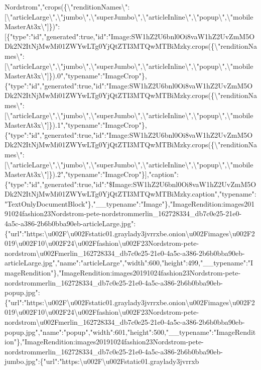 Nordstrom","crops(\{\textbackslash{}"renditionNames\textbackslash{}":{[}\textbackslash{}"articleLarge\textbackslash{}",\textbackslash{}"jumbo\textbackslash{}",\textbackslash{}"superJumbo\textbackslash{}",\textbackslash{}"articleInline\textbackslash{}",\textbackslash{}"popup\textbackslash{}",\textbackslash{}"mobileMasterAt3x\textbackslash{}"{]}\})":{[}\{"type":"id","generated":true,"id":"Image:SW1hZ2U6bnl0Oi8vaW1hZ2UvZmM5ODk2N2ItNjMwMi01ZWYwLTg0YjQtZTI3MTQwMTBiMzky.crops(\{\textbackslash{}"renditionNames\textbackslash{}":{[}\textbackslash{}"articleLarge\textbackslash{}",\textbackslash{}"jumbo\textbackslash{}",\textbackslash{}"superJumbo\textbackslash{}",\textbackslash{}"articleInline\textbackslash{}",\textbackslash{}"popup\textbackslash{}",\textbackslash{}"mobileMasterAt3x\textbackslash{}"{]}\}).0","typename":"ImageCrop"\},\{"type":"id","generated":true,"id":"Image:SW1hZ2U6bnl0Oi8vaW1hZ2UvZmM5ODk2N2ItNjMwMi01ZWYwLTg0YjQtZTI3MTQwMTBiMzky.crops(\{\textbackslash{}"renditionNames\textbackslash{}":{[}\textbackslash{}"articleLarge\textbackslash{}",\textbackslash{}"jumbo\textbackslash{}",\textbackslash{}"superJumbo\textbackslash{}",\textbackslash{}"articleInline\textbackslash{}",\textbackslash{}"popup\textbackslash{}",\textbackslash{}"mobileMasterAt3x\textbackslash{}"{]}\}).1","typename":"ImageCrop"\},\{"type":"id","generated":true,"id":"Image:SW1hZ2U6bnl0Oi8vaW1hZ2UvZmM5ODk2N2ItNjMwMi01ZWYwLTg0YjQtZTI3MTQwMTBiMzky.crops(\{\textbackslash{}"renditionNames\textbackslash{}":{[}\textbackslash{}"articleLarge\textbackslash{}",\textbackslash{}"jumbo\textbackslash{}",\textbackslash{}"superJumbo\textbackslash{}",\textbackslash{}"articleInline\textbackslash{}",\textbackslash{}"popup\textbackslash{}",\textbackslash{}"mobileMasterAt3x\textbackslash{}"{]}\}).2","typename":"ImageCrop"\}{]},"caption":\{"type":"id","generated":true,"id":"\$Image:SW1hZ2U6bnl0Oi8vaW1hZ2UvZmM5ODk2N2ItNjMwMi01ZWYwLTg0YjQtZTI3MTQwMTBiMzky.caption","typename":"TextOnlyDocumentBlock"\},"\_\_typename":"Image"\},"ImageRendition:images20191024fashion23Nordstrom-pete-nordstrommerlin\_162728334\_db7c0e25-21e0-4a5c-a386-2b6b0bba90eb-articleLarge.jpg":\{"url":"https:\textbackslash{}u002F\textbackslash{}u002Fstatic01.graylady3jvrrxbe.onion\textbackslash{}u002Fimages\textbackslash{}u002F2019\textbackslash{}u002F10\textbackslash{}u002F24\textbackslash{}u002Ffashion\textbackslash{}u002F23Nordstrom-pete-nordstrom\textbackslash{}u002Fmerlin\_162728334\_db7c0e25-21e0-4a5c-a386-2b6b0bba90eb-articleLarge.jpg","name":"articleLarge","width":600,"height":499,"\_\_typename":"ImageRendition"\},"ImageRendition:images20191024fashion23Nordstrom-pete-nordstrommerlin\_162728334\_db7c0e25-21e0-4a5c-a386-2b6b0bba90eb-popup.jpg":\{"url":"https:\textbackslash{}u002F\textbackslash{}u002Fstatic01.graylady3jvrrxbe.onion\textbackslash{}u002Fimages\textbackslash{}u002F2019\textbackslash{}u002F10\textbackslash{}u002F24\textbackslash{}u002Ffashion\textbackslash{}u002F23Nordstrom-pete-nordstrom\textbackslash{}u002Fmerlin\_162728334\_db7c0e25-21e0-4a5c-a386-2b6b0bba90eb-popup.jpg","name":"popup","width":601,"height":500,"\_\_typename":"ImageRendition"\},"ImageRendition:images20191024fashion23Nordstrom-pete-nordstrommerlin\_162728334\_db7c0e25-21e0-4a5c-a386-2b6b0bba90eb-jumbo.jpg":\{"url":"https:\textbackslash{}u002F\textbackslash{}u002Fstatic01.graylady3jvrrxb
